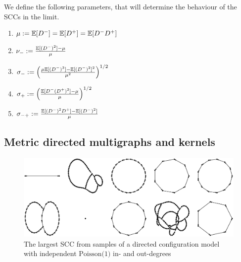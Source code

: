 We define the following parameters, that will determine the behaviour of the SCCs in the limit.
\begin{enumerate}
    \item $\mu:={\mathbb E}[D^-]={\mathbb E}[D^+]={\mathbb E}[D^-D^+]$
    \item $\nu_-:=\frac{{\mathbb E}[(D^-)^2]-\mu}{\mu}$ 
    \item $\sigma_-:=\left(\frac{\mu{\mathbb E}[(D^-)^3]-{\mathbb E}[(D^-)^2]^2}{\mu^2}\right)^{1/2}$ 
    \item $\sigma_+:=\left(\frac{{\mathbb E}[D^-(D^+)^2]-\mu}{\mu}\right)^{1/2}$ 
    \item $\sigma_{-+}:=\frac{{\mathbb E}[(D^-)^2D^+]-{\mathbb E}[(D^-)^2]}{\mu}$ 
\end{enumerate}
\subsection{Metric directed multigraphs and kernels}

\begin{figure}[htbp]
    \centering

    \includegraphics[width=\textwidth]{Content/Pictures/largest_sccs.eps}
    
    \caption{The largest SCC from samples of a directed configuration model with independent $\text{Poisson(1)}$ in- and out-degrees}
    \label{fig:largest-sccs}
\end{figure}

